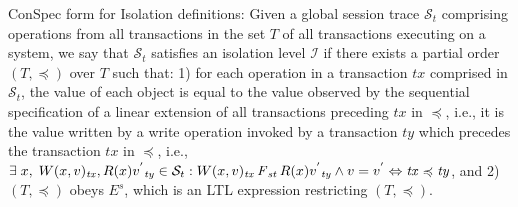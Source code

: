 \documentclass[acmlarge, ,11pt]{acmart}
\begin{document}
  \begin{definition}{ConSpec form for Isolation definitions:}\label{def:form0} 
Given a global session trace $\mathcal{S}_t$ comprising %
 operations from all transactions in the set $T$ of all transactions executing on a system, %
we say  that   $\mathcal{S}_t$ satisfies an isolation level $\mathcal{I}$
 if there exists a partial order  $\left( T, \preccurlyeq \right)$ over $T$ %
 such that:  %
 1) for each operation in a transaction ${\mathit{tx}}$ comprised in $\mathcal{S}_t$,  the value of each object is equal to the value observed by the sequential  specification of a linear extension of all transactions preceding ${\mathit{tx}}$ in $\preccurlyeq$, i.e., it is the value written by a write operation invoked by a transaction $ {\mathit{ty}}$ which 
  precedes the transaction $ {\mathit{tx}}$ in $\preccurlyeq$,  
  i.e.,  $\exists \; x, \; W(x,v)_{\mathit{tx}}, R(x){v^{'}}_{\mathit{ty}} \in  \mathcal{S}_t: W(x,v)_{\mathit{tx}} \operatorname{\it F}_\mathit{st} R(x){v^{'}}_{\mathit{ty}} \wedge  v = v^{'}  \Leftrightarrow \mathit{tx} \preccurlyeq \mathit{ty}$, 
  and  %
 2) $\left( T, \preccurlyeq \right)$ obeys $E^s$, which is an LTL expression restricting $\left( T, \preccurlyeq \right)$.
\end{definition} 
\end{document}
